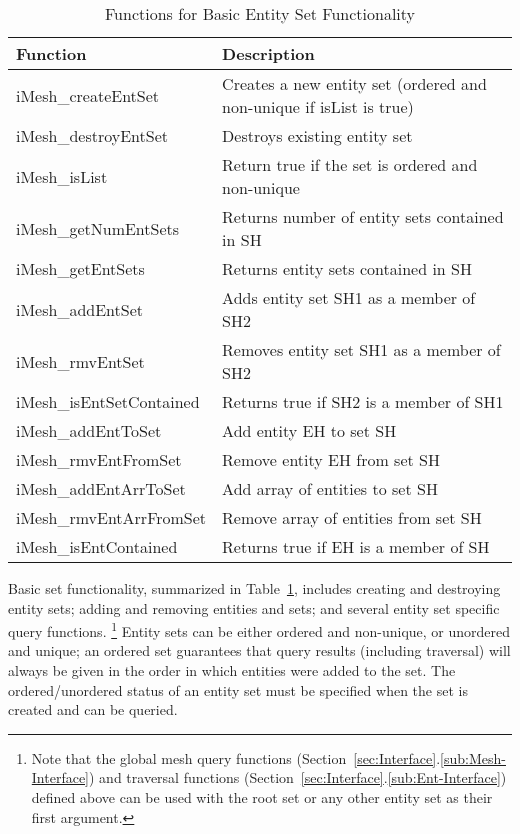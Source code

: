 %
\begin{table}

\caption{Functions for Basic Entity Set Functionality}

\label{table:EntSet} \begin{tabular}{|p{1.25in}|p{223pt}|}
\hline 
{\small Function}&
{\small Description}\tabularnewline
\hline
\hline 
{\small iMesh\_createEntSet}&
{\small Creates a new entity set (ordered and non-unique if isList
is true)}\tabularnewline
\hline 
{\small iMesh\_destroyEntSet}&
{\small Destroys existing entity set}\tabularnewline
\hline 
{\small iMesh\_isList}&
{\small Return true if the set is ordered and non-unique}\tabularnewline
\hline
\hline 
{\small iMesh\_getNumEntSets}&
{\small Returns number of entity sets contained in SH}\tabularnewline
\hline 
{\small iMesh\_getEntSets}&
{\small Returns entity sets contained in SH}\tabularnewline
\hline 
{\small iMesh\_addEntSet}&
{\small Adds entity set SH1 as a member of SH2}\tabularnewline
\hline 
{\small iMesh\_rmvEntSet}&
{\small Removes entity set SH1 as a member of SH2}\tabularnewline
\hline 
{\small iMesh\_isEntSetContained}&
{\small Returns true if SH2 is a member of SH1}\tabularnewline
\hline
\hline 
{\small iMesh\_addEntToSet}&
{\small Add entity EH to set SH}\tabularnewline
\hline 
{\small iMesh\_rmvEntFromSet}&
{\small Remove entity EH from set SH}\tabularnewline
\hline 
{\small iMesh\_addEntArrToSet}&
{\small Add array of entities to set SH}\tabularnewline
\hline 
{\small iMesh\_rmvEntArrFromSet}&
{\small Remove array of entities from set SH}\tabularnewline
\hline 
{\small iMesh\_isEntContained}&
{\small Returns true if EH is a member of SH}\tabularnewline
\hline
\end{tabular}
\end{table}


Basic set functionality, summarized in Table~\ref{table:EntSet},
includes creating and destroying entity sets; adding and removing
entities and sets; and several entity set specific query functions.
%
\footnote{Note that the global mesh query functions (Section~\ref{sec:Interface}.\ref{sub:Mesh-Interface})
and traversal functions (Section~\ref{sec:Interface}.\ref{sub:Ent-Interface})
defined above can be used with the root set or any other entity set
as their first argument.%
} Entity sets can be either ordered and non-unique, or unordered and
unique; an ordered set guarantees that query results (including traversal)
will always be given in the order in which entities were added to
the set. The ordered/unordered status of an entity set must be specified
when the set is created and can be queried.

